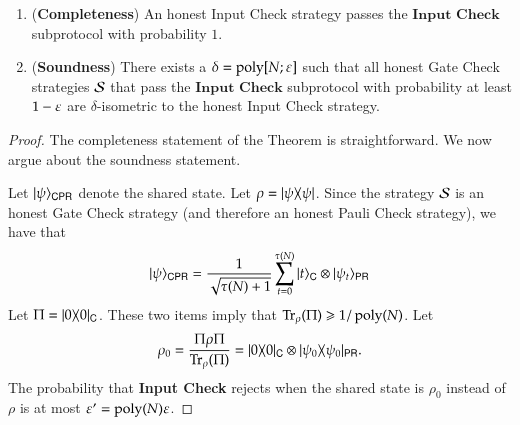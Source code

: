 \begin{lemma}	
\label{lem:input_check}
\leavevmode
\begin{enumerate}
	\item (\textbf{Completeness}) An honest Input Check strategy passes the $\textbf{Input Check}$ subprotocol with probability $1$. 
	\item (\textbf{Soundness}) There exists a $\delta = \operatorname{poly}[N;\varepsilon]$ such that all honest Gate Check strategies $\mathcal{S}$ that pass the $\textbf{Input Check}$ subprotocol with probability at least $1 - \varepsilon$ are $\delta$-isometric to the honest Input Check strategy.
\end{enumerate}
\end{lemma}
\begin{proof}
The completeness statement of the Theorem is straightforward. We now argue about the soundness statement.

Let $|\psi\rangle_{{\mathsf{C}} {\mathsf{P}} {\mathsf{R}}}$ denote the shared state. Let $\rho = |\psi\rangle\! \langle \psi|$. Since the strategy $\mathcal{S}$ is an honest Gate Check strategy (and therefore an honest Pauli Check strategy), we have that
\[
|\psi\rangle_{{\mathsf{C}}{\mathsf{P}} {\mathsf{R}}} = \frac{1}{\sqrt{\tau(N)+1}} \sum_{t = 0}^{\tau(N)} |t\rangle_{{\mathsf{C}}} \otimes |\psi_t\rangle_{{\mathsf{P}} {\mathsf{R}}}
\]
Let $\Pi = |0\rangle\! \langle 0|_{{\mathsf{C}}}$. These two items imply that $\operatorname{Tr}_\rho (\Pi) \geqslant 1/\operatorname{poly}(N)$. Let 
\[
	\rho_{0} = \frac{\Pi \rho \Pi}{\operatorname{Tr}_\rho (\Pi)} = |0\rangle\! \langle 0|_{{\mathsf{C}}} \otimes |\psi_0\rangle\! \langle \psi_0|_{{\mathsf{P}} {\mathsf{R}}}.
\]
The probability that \textbf{Input Check} rejects when the shared state is $\rho_{0}$ instead of $\rho$ is at most $\varepsilon' = \operatorname{poly}(N) \varepsilon$. 


\end{proof}
